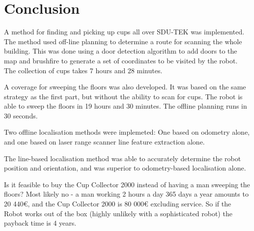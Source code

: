 \section{Conclusion}
\label{sec:conclusion}
A method for finding and picking up cups all over SDU-TEK was implemented. The method used off-line planning to determine a route for scanning the whole building. 
This was done using a door detection algorithm to add doors to the map and brushfire to generate a set of coordinates to be visited by the robot.
The collection of cups takes 7 hours and 28 minutes.

A coverage for sweeping the floors was also developed. It was based on the same strategy as the first part, but without the ability to scan for cups. The robot is able to sweep the floors in 19 hours and 30 minutes. The offline planning runs in 30 seconds. 

Two offline localisation methods were implemeted:
One based on odometry alone, and one based on laser range scanner line feature extraction alone.

The line-based localisation method was able to accurately determine the robot position and orientation,
and was superior to odometry-based localisation alone.

Is it feasible to buy the Cup Collector 2000 instead of having a man sweeping the floors? Most likely no - a man working 2 hours a day 365 days a year amounts to 20 440€, and the Cup Collector 2000 is 80 000€ excluding service. So if the Robot works out of the box (highly unlikely with a sophisticated robot) the payback time is 4 years.  